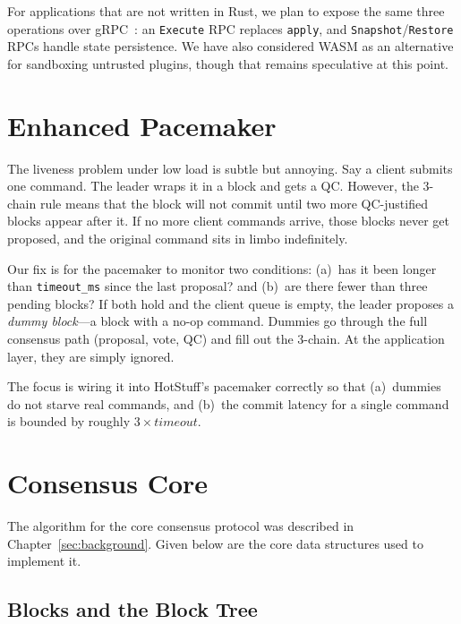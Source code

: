 For applications that are not written in Rust, we plan to expose the same three operations
over gRPC~\cite{grpc}: an \texttt{Execute} RPC replaces \texttt{apply}, and
\texttt{Snapshot}/\texttt{Restore} RPCs handle state persistence.  We have also considered
WASM as an alternative for sandboxing untrusted plugins, though that remains speculative at
this point.

\section{Enhanced Pacemaker}
\label{sec:pacemaker}

The liveness problem under low load is subtle but annoying.  Say a client submits one
command.  The leader wraps it in a block and gets a QC.  However, the 3-chain rule means
that the block will not commit until two more QC-justified blocks appear after it.  If no
more client commands arrive, those blocks never get proposed, and the original command sits
in limbo indefinitely.

Our fix is for the pacemaker to monitor two conditions: (a)~has it been longer than
\texttt{timeout\_ms} since the last proposal? and (b)~are there fewer than three pending
blocks?  If both hold and the client queue is empty, the leader proposes a \emph{dummy
block}---a block with a no-op command.  Dummies go through the full consensus path
(proposal, vote, QC) and fill out the 3-chain.  At the application layer, they are simply
ignored.

The focus is wiring it into HotStuff's pacemaker correctly so that (a)~dummies do not
starve real commands, and (b)~the commit latency for a single command is bounded by roughly
$3 \times \textit{timeout}$.

\section{Consensus Core}

The algorithm for the core consensus protocol was described in
Chapter~\ref{sec:background}.  Given below are the core data structures used to implement
it.

\subsection{Blocks and the Block Tree}

